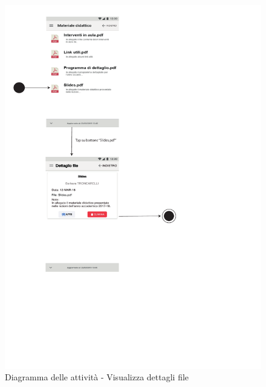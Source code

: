 \begin{figure}
	\centering
	\includegraphics[width=6in]{imgs/gruppo1/activity_diagrams/AD15_dettagli_file.pdf}
	\caption{Diagramma delle attività - Visualizza dettagli file}
	\label{diag:visualizzaDettagliFileAD}
\end{figure}
\newpage

